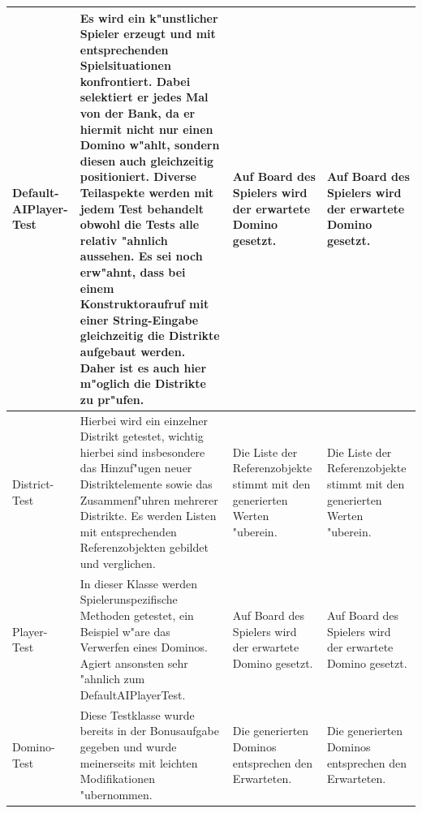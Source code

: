\begin{longtable}{|p{1.5cm}|p{7.5cm}|p{2cm}|p{2cm}|}
 	\hline 
	
	Default- \newline AIPlayer- \newline Test
	& Es wird ein k"unstlicher Spieler erzeugt und mit entsprechenden Spielsituationen konfrontiert. Dabei selektiert er jedes Mal von der Bank, da er hiermit nicht nur einen Domino w"ahlt, sondern diesen auch gleichzeitig positioniert. Diverse Teilaspekte werden mit jedem Test behandelt obwohl die Tests alle relativ "ahnlich aussehen. Es sei noch erw"ahnt, dass bei einem Konstruktoraufruf mit einer String-Eingabe gleichzeitig die Distrikte aufgebaut werden. Daher ist es auch hier m"oglich die Distrikte zu pr"ufen. 
	& Auf Board des Spielers wird der erwartete Domino gesetzt. 
	& Auf Board des Spielers wird der erwartete Domino gesetzt. \\
	
	\hline 
 	
 	District- \newline Test
	& Hierbei wird ein einzelner Distrikt getestet, wichtig hierbei sind insbesondere das Hinzuf"ugen neuer Distriktelemente sowie das Zusammenf"uhren mehrerer Distrikte. Es werden Listen mit entsprechenden Referenzobjekten gebildet und verglichen. 
	& Die Liste der Referenzobjekte stimmt mit den generierten Werten "uberein. 
	& Die Liste der Referenzobjekte stimmt mit den generierten Werten "uberein. \\
	
	\hline 
 	
	Player- \newline Test
	& In dieser Klasse werden Spielerunspezifische Methoden getestet, ein Beispiel w"are das Verwerfen eines Dominos. Agiert ansonsten sehr "ahnlich zum DefaultAIPlayerTest. 
	& Auf Board des Spielers wird der erwartete Domino gesetzt. 
	& Auf Board des Spielers wird der erwartete Domino gesetzt. \\
	
	\hline 
	
	Domino- \newline Test
	& Diese Testklasse wurde bereits in der Bonusaufgabe gegeben und wurde meinerseits mit leichten Modifikationen "ubernommen. 
	& Die generierten Dominos entsprechen den Erwarteten. 
	& Die generierten Dominos entsprechen den Erwarteten. \\
 	
	\hline
	
\end{longtable}

